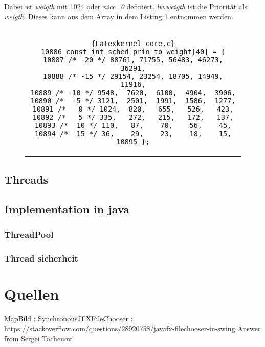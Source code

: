 Dabei ist \textit{weigth} mit 1024 oder \textit{nice\_0} definiert. \textit{lw.weigth} ist die Priorität als \textit{weigth}. Dieses kann aus dem Array in dem Listing \ref{core.c}\cite{Linux:Torvalds} entnommen werden.
\begin{figure}[h]
    \centering      
    \begin{tabular}{c}
        \begin{lstlisting}{Latexkernel core.c}
10886 const int sched_prio_to_weight[40] = {
10887 /* -20 */ 88761, 71755, 56483, 46273, 36291,
10888 /* -15 */ 29154, 23254, 18705, 14949, 11916,
10889 /* -10 */ 9548,  7620,  6100,  4904,  3906,
10890 /*  -5 */ 3121,  2501,  1991,  1586,  1277,
10891 /*   0 */ 1024,  820,   655,   526,   423,
10892 /*   5 */ 335,   272,   215,   172,   137,
10893 /*  10 */ 110,   87,    70,    56,    45,
10894 /*  15 */ 36,    29,    23,    18,    15,
10895 };
        \end{lstlisting}
    \end{tabular}
    \label{core.c}
\end{figure}
\newpage
\subsection{Threads}

\subsection{Implementation in java}

\subsubsection{ThreadPool}

\subsubsection{Thread sicherheit}

\section{Quellen}
MapBild :
SynchronousJFXFileChooser : https://stackoverflow.com/questions/28920758/javafx-filechooser-in-swing
Answer from Sergei Tachenov